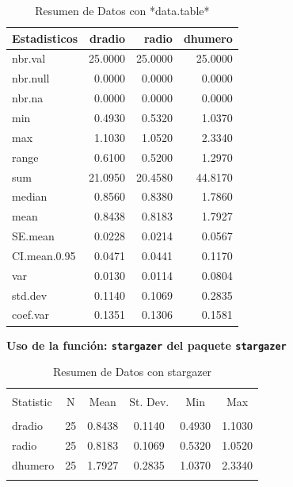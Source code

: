 \documentclass[12pt,a4paper,]{book}
\numberwithin{dummy}{section}
\theoremstyle{ocrenumbox}
\theoremstyle{ocrenumbox}
\theoremstyle{ocrenumbox}
\theoremstyle{ocrenumbox}
\theoremstyle{ocrenum}
\begin{document}
\begingroup\fontsize{8}{10}\selectfont

\begin{longtable}[t]{lrrr}
\caption{\label{tab:unnamed-chunk-11}Resumen de Datos con *data.table*}\\
\toprule
Estadisticos & dradio & radio & dhumero\\
\midrule
nbr.val & 25.0000 & 25.0000 & 25.0000\\
nbr.null & 0.0000 & 0.0000 & 0.0000\\
nbr.na & 0.0000 & 0.0000 & 0.0000\\
min & 0.4930 & 0.5320 & 1.0370\\
max & 1.1030 & 1.0520 & 2.3340\\
\addlinespace
range & 0.6100 & 0.5200 & 1.2970\\
sum & 21.0950 & 20.4580 & 44.8170\\
median & 0.8560 & 0.8380 & 1.7860\\
mean & 0.8438 & 0.8183 & 1.7927\\
SE.mean & 0.0228 & 0.0214 & 0.0567\\
\addlinespace
CI.mean.0.95 & 0.0471 & 0.0441 & 0.1170\\
var & 0.0130 & 0.0114 & 0.0804\\
std.dev & 0.1140 & 0.1069 & 0.2835\\
coef.var & 0.1351 & 0.1306 & 0.1581\\
\bottomrule
\end{longtable}
\endgroup{}

\textbf{Uso de la función: \texttt{stargazer} del paquete
\texttt{stargazer}}

\begin{table}[!htbp] \centering
\caption{Resumen de Datos con stargazer}
\label{tabla-1}
\begin{tabular}{lccccc}
\\[-1.8ex]\hline
\hline \\[-1.8ex]
Statistic & \multicolumn{1}{c}{N} & \multicolumn{1}{c}{Mean} & \multicolumn{1}{c}{St. Dev.} & \multicolumn{1}{c}{Min} & \multicolumn{1}{c}{Max} \\
\hline \\[-1.8ex]
dradio & 25 & 0.8438 & 0.1140 & 0.4930 & 1.1030 \\
radio & 25 & 0.8183 & 0.1069 & 0.5320 & 1.0520 \\
dhumero & 25 & 1.7927 & 0.2835 & 1.0370 & 2.3340 \\
\hline \\[-1.8ex]
\end{tabular}
\end{table}
\end{document}
